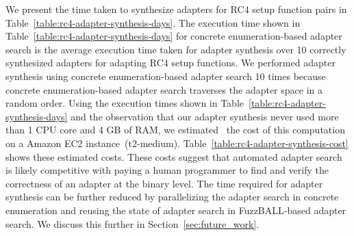 We present the time taken to synthesize adapters for RC4 setup function
pairs in Table~\ref{table:rc4-adapter-synthesis-days}.
%
The execution time shown in Table~\ref{table:rc4-adapter-synthesis-days}
for concrete enumeration-based adapter search is the average execution time
taken for adapter synthesis over 10 correctly synthesized adapters for
adapting RC4 setup functions.
%
We performed adapter synthesis using concrete enumeration-based adapter
search 10 times because concrete enumeration-based adapter search
traverses the adapter space in a random order.
%
Using the execution times shown in Table~\ref{table:rc4-adapter-synthesis-days}
and the observation that our adapter synthesis never used more than 1 CPU core
and 4 GB of RAM, we estimated~\cite{amazon-ec2-pricing} the cost of
this computation on a Amazon EC2 instance~(t2-medium).
%
Table~\ref{table:rc4-adapter-synthesis-cost} shows these estimated costs.
%
These costs suggest that automated
adapter search is likely competitive with paying a human programmer to find
and verify the correctness of an adapter at the binary level.
%
The time required for adapter synthesis can be
further reduced by parallelizing the adapter search in concrete
enumeration and reusing the state of adapter search in FuzzBALL-based
adapter search.
%
We discuss this further in Section~\ref{sec:future_work}.
%
%
\noindent
%


%
